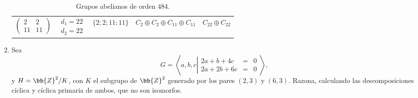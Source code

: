 \begin{ejercicio}
\begin{enumerate}
\begin{table}[h]
\begin{tabular}{c|c|c|c|c}
                $\begin{pmatrix}
                    2 & 2\\
                    11 & 11
                \end{pmatrix}
                $ & $\begin{array}{c}
                    d_1=22\\
                    d_2=22
                \end{array}$ & $\{2; 2; 11; 11\}$ & $C_2 \oplus C_2 \oplus C_{11} \oplus C_{11}$ & $C_{22} \oplus C_{22}$
            \end{tabular}
            \caption{Grupos abelianos de orden $484$.}
            \label{tab:grupos_abelianos_orden_484}
        \end{table}
        \item Sea
        \begin{equation*}
            G = \left\langle a, b, c \left|
                \begin{array}{rcl}
                    2a + b + 4c &=& 0 \\
                    2a + 2b + 6c &=& 0
                \end{array}
            \right.\right\rangle,
        \end{equation*}
        y $H = \bb{Z}^2/K$, con $K$ el subgrupo de $\bb{Z}^2$ generado por los pares $(2, 3)$ y $(6, 3)$. Razona, calculando las descomposiciones cíclica y cíclica primaria de ambos, que no son isomorfos.


\end{enumerate}
\end{ejercicio}
